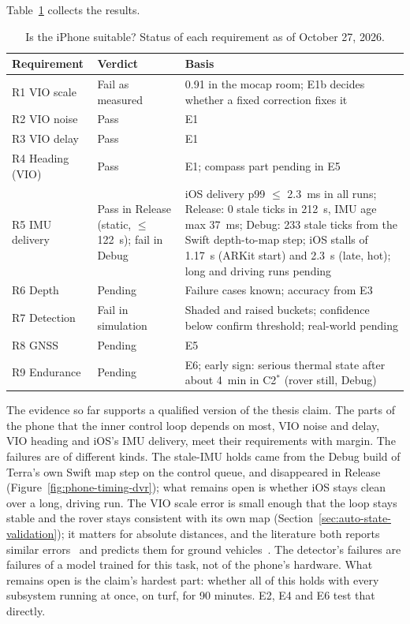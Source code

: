 Table~\ref{tab:phone-verdict} collects the results.

\begin{table}[ht]
\centering
\caption{Is the iPhone suitable? Status of each requirement as of October 27, 2026.}
\label{tab:phone-verdict}
\small
\begin{tabularx}{\textwidth}{@{}l l X@{}}
\toprule
Requirement & Verdict & Basis \\
\midrule
R1 VIO scale & Fail as measured & 0.91 in the mocap room; E1b decides whether a fixed correction fixes it \\
R2 VIO noise & Pass & E1 \\
R3 VIO delay & Pass & E1 \\
R4 Heading (VIO) & Pass & E1; compass part pending in E5 \\
R5 IMU delivery & Pass in Release (static, $\le$122~s); fail in Debug & iOS delivery p99 $\le$ 2.3~ms in all runs; Release: 0 stale ticks in 212~s, IMU age max 37~ms; Debug: 233 stale ticks from the Swift depth-to-map step; iOS stalls of 1.17~s (ARKit start) and 2.3~s (late, hot); long and driving runs pending \\
R6 Depth & Pending & Failure cases known; accuracy from E3 \\
R7 Detection & Fail in simulation & Shaded and raised buckets; confidence below confirm threshold; real-world pending \\
R8 GNSS & Pending & E5 \\
R9 Endurance & Pending & E6; early sign: serious thermal state after about 4~min in C2$^{*}$ (rover still, Debug) \\
\bottomrule
\end{tabularx}
\end{table}

The evidence so far supports a qualified version of the thesis claim.
The parts of the phone that the inner control loop depends on most, VIO noise and delay, VIO heading and iOS's IMU delivery, meet their requirements with margin.
The failures are of different kinds.
The stale-IMU holds came from the Debug build of Terra's own Swift map step on the control queue, and disappeared in Release (Figure~\ref{fig:phone-timing-dvr}); what remains open is whether iOS stays clean over a long, driving run.
The VIO scale error is small enough that the loop stays stable and the rover stays consistent with its own map (Section~\ref{sec:auto-state-validation}); it matters for absolute distances, and the literature both reports similar errors~\citep{feigl2020localization} and predicts them for ground vehicles~\citep{wu2017vinswheels}.
The detector's failures are failures of a model trained for this task, not of the phone's hardware.
What remains open is the claim's hardest part: whether all of this holds with every subsystem running at once, on turf, for 90 minutes.
E2, E4 and E6 test that directly.
